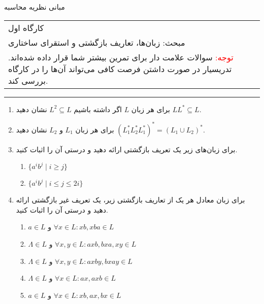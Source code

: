 \documentclass{article}
\renewcommand{\labelenumii}{\alph{enumii})}
\let\oldlabelenumii=\labelenumii
\newcommand*\circled[1]{
	\tikz[baseline=(char.base)]{
		\node[shape=circle,draw,inner sep=-1pt,color=red] (char) {\textcolor{black}{#1}\strut}
	}\kern-3pt
}
\newcommand{\StartCircledEnumii}{\renewcommand{\labelenumii}{\circled{\oldlabelenumii}}}
\newcommand{\EndCircledEnumii}{\renewcommand{\labelenumii}{\oldlabelenumii}}
\begin{document}
	\begin{center}
		\Huge
		مبانی نظریه محاسبه
	\end{center}
	\Large
	\begin{tabularx}{\linewidth}{>{\raggedleft\arraybackslash}X}
		کارگاه اول
		\\
		مبحث: زبان‌ها، تعاریف بازگشتی و استقرای ساختاری
		\\
		\textcolor{red}{توجه:}
		سوالات علامت دار برای تمرین بیشتر شما قرار داده شده‌‌اند. تدریسیار در صورت داشتن فرصت کافی می‌تواند آن‌ها را در کارگاه بررسی کند.
	\end{tabularx}
	\rule{\textwidth}{1pt}
	\begin{enumerate}
		\item
		برای هر زبان $L$ اگر داشته باشیم
		$L^2 \subseteq L$
		نشان دهید
		$LL^* \subseteq L$.
		\item
		برای هر زبان $L_1$ و $L_2$ نشان دهید
		$(L_{1}^{*}L_{2}^{*}L_{1}^{*})^* = (L_1 \cup L_2)^*$.
			\item 
			برای زبان‌های زیر یک تعریف بازگشتی ارائه دهید و درستی آن را اثبات کنید.
			\begin{enumerate}
				\item 
				$\{a^ib^j \; | \; i \geq j \}$
				\item 
				$\{a^ib^j \; | \; i \leq j \leq 2i \}$
			\end{enumerate}
		\item
		برای زبان معادل هر یک از تعاریف بازگشتی زیر، یک تعریف غیر بازگشتی ارائه دهید و درستی آن را اثبات کنید.
		
		\begin{enumerate}
			\item 
			$a \in L$
			و
			$\forall x \in L :  xb, xba \in L$
			\item
			$\Lambda \in L$
			و
			$\forall x,y \in L : axb, bxa, xy \in L$
			\item 
			$\Lambda \in L$
			و
			$\forall x,y \in L :  axby, bxay \in L$
			\StartCircledEnumii
			\item 
			\EndCircledEnumii
			$\Lambda \in L$
			و
			$\forall x \in L : ax, axb \in L$
			\StartCircledEnumii
			\item 
			\EndCircledEnumii
			$a \in L$
			و
			$\forall x \in L :  xb, ax, bx \in L$


\end{enumerate}
\end{enumerate}
\end{document}
